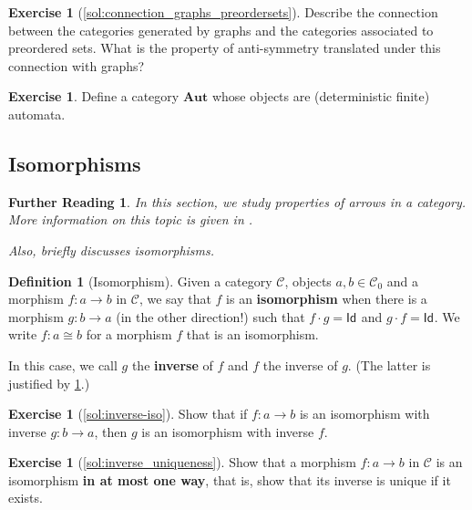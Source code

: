 \documentclass[a4paper,10pt]{scrartcl}
\theoremstyle{plain}
\newtheorem*{reading*}{Further Reading}
\theoremstyle{definition}
\newtheorem{dfn}[thm]{Definition}
\newtheorem{exer}[thm]{Exercise}
\newcommand{\cfont}[1]{\ensuremath{\mathsf{#1}}}
\newcommand{\Cat}[1]{\mathcal{#1}}
\newcommand{\CC}{\Cat{C}}
\newcommand{\Catb}[1]{\mathbf{#1}}
\newcommand{\Ob}[1]{{#1}_0}
\newcommand{\Id}[1][]{\cfont{Id}_{#1}}
\newcommand{\Comp}{\cdot}
\begin{document}
\begin{exer}[\cref{sol:connection_graphs_preordersets}] \label{exer:connection_graphs_preordersets}
Describe the connection between the categories generated by graphs and the categories associated to preordered sets. What is the property of anti-symmetry translated under this connection with graphs?
\end{exer}

\begin{exer} Define a category $\Catb{Aut}$ whose objects are (deterministic finite) automata. 
\end{exer}

\subsection{Isomorphisms}
\label{sec:isos}

\begin{reading*}
  In this section, we study properties of arrows in a category.
  More information on this topic is given in \cite[\S 2.7]{barr-wells}.

  Also, \cite[\S 2.2]{pierce} briefly discusses isomorphisms.
\end{reading*}


\begin{dfn}[Isomorphism]
  Given a category $\CC$, objects $a,b \in \Ob{\CC}$ and a morphism $f : a \to b$ in $\CC$, we say that $f$ is an \textbf{isomorphism} when there is a morphism $g : b \to a$ (in the other direction!) such that $f \Comp g = \Id$ and $g \Comp f = \Id$.
  We write $f : a \cong b$ for a morphism $f$ that is an isomorphism.

  In this case, we call $g$ the \textbf{inverse} of $f$ and $f$ the inverse of $g$. (The latter is justified by \cref{exer:inverse-iso}.)
\end{dfn}

\begin{exer}[\cref{sol:inverse-iso}]\label{exer:inverse-iso}
  Show that if $f : a \to b$ is an isomorphism with inverse $g : b \to a$, then $g$ is an isomorphism with inverse $f$.
\end{exer}

\begin{exer}[\cref{sol:inverse_uniqueness}]\label{exer:inverse_uniqueness}
  Show that a morphism $f : a \to b$ in $\CC$ is an isomorphism \textbf{in at most one way}, that is, show that its inverse is unique if it exists.
\end{exer}
\end{document}
